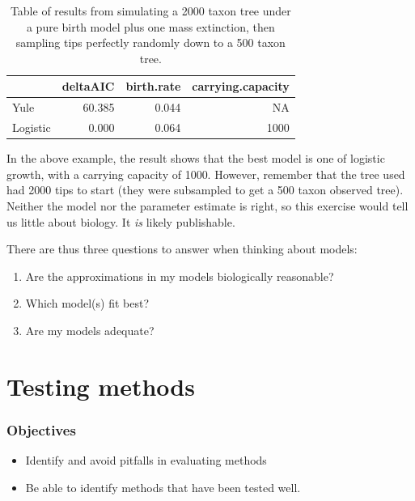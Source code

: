 \documentclass[
]{article}
\providecommand{\tightlist}{%
  \setlength{\itemsep}{0pt}\setlength{\parskip}{0pt}}
\begin{document}
\begin{table}

\caption{\label{tab:unnamed-chunk-8}Table of results from simulating a 2000 taxon tree under a pure birth model plus one mass extinction, then sampling tips perfectly randomly down to a 500 taxon tree.}
\centering
\begin{tabular}[t]{l|r|r|r}
\hline
  & deltaAIC & birth.rate & carrying.capacity\\
\hline
Yule & 60.385 & 0.044 & NA\\
\hline
Logistic & 0.000 & 0.064 & 1000\\
\hline
\end{tabular}
\end{table}

In the above example, the result shows that the best model is one of logistic growth, with a carrying capacity of 1000. However, remember that the tree used had 2000 tips to start (they were subsampled to get a 500 taxon observed tree). Neither the model nor the parameter estimate is right, so this exercise would tell us little about biology. It \emph{is} likely publishable.

There are thus three questions to answer when thinking about models:

\begin{enumerate}
\def\labelenumi{\arabic{enumi})}
\tightlist
\item
  Are the approximations in my models biologically reasonable?
\item
  Which model(s) fit best?
\item
  Are my models adequate?
\end{enumerate}

\hypertarget{testing-methods}{%
\section{Testing methods}\label{testing-methods}}

\hypertarget{objectives-1}{%
\subsubsection{Objectives}\label{objectives-1}}

\begin{itemize}
\tightlist
\item
  Identify and avoid pitfalls in evaluating methods
\item
  Be able to identify methods that have been tested well.
\end{itemize}
\end{document}
